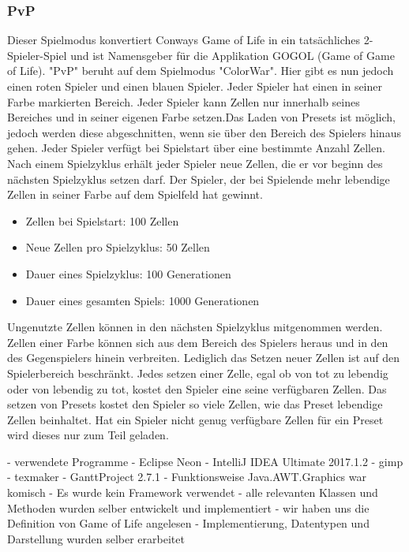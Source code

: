 \documentclass[12pt]{article}
\theoremstyle{plain}
\begin{document}
\begin{linenumbers}
\subsubsection{PvP}
Dieser Spielmodus konvertiert Conways Game of Life in ein tatsächliches 2-Spieler-Spiel und ist Namensgeber für die Applikation GOGOL (Game of Game of Life). "PvP" beruht auf dem Spielmodus "ColorWar". Hier gibt es nun jedoch einen roten Spieler und einen blauen Spieler. Jeder Spieler hat einen in seiner Farbe markierten Bereich. Jeder Spieler kann Zellen nur innerhalb seines Bereiches und in seiner eigenen Farbe setzen.Das Laden von Presets ist möglich, jedoch werden diese abgeschnitten, wenn sie über den Bereich des Spielers hinaus gehen. Jeder Spieler verfügt bei Spielstart über eine bestimmte Anzahl Zellen. Nach einem Spielzyklus erhält jeder Spieler neue Zellen, die er vor beginn des nächsten Spielzyklus setzen darf. Der Spieler, der bei Spielende mehr lebendige Zellen in seiner Farbe auf dem Spielfeld hat gewinnt.
\begin{itemize}
\item
Zellen bei Spielstart: 100 Zellen
\item
Neue Zellen pro Spielzyklus: 50 Zellen
\item
Dauer eines Spielzyklus: 100 Generationen
\item
Dauer eines gesamten Spiels: 1000 Generationen
\end{itemize}
Ungenutzte Zellen können in den nächsten Spielzyklus mitgenommen werden. Zellen einer Farbe können sich aus dem Bereich des Spielers heraus und in den des Gegenspielers hinein verbreiten. Lediglich das Setzen neuer Zellen ist auf den Spielerbereich beschränkt. Jedes setzen einer Zelle, egal ob von tot zu lebendig oder von lebendig zu tot, kostet den Spieler eine seine verfügbaren Zellen. Das setzen von Presets kostet den Spieler so viele Zellen, wie das Preset lebendige Zellen beinhaltet. Hat ein Spieler nicht genug verfügbare Zellen für ein Preset wird dieses nur zum Teil geladen.

- verwendete Programme
	- Eclipse Neon
	- IntelliJ IDEA Ultimate 2017.1.2
	- gimp
	- texmaker
	- GanttProject 2.7.1
- Funktionsweise Java.AWT.Graphics war komisch
- Es wurde kein Framework verwendet
	- alle relevanten Klassen und Methoden wurden selber entwickelt und implementiert
- wir haben uns die Definition von Game of Life angelesen
	- Implementierung, Datentypen und Darstellung wurden selber erarbeitet


\end{linenumbers}
\end{document}

